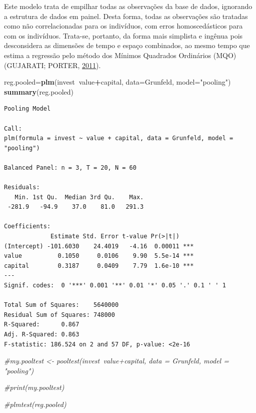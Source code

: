 \documentclass[12pt,brazil,oneside]{book}
\newenvironment{Shaded}{\begin{snugshade}}{\end{snugshade}}
\newcommand{\CommentTok}[1]{\textcolor[rgb]{0.56,0.35,0.01}{\textit{#1}}}
\newcommand{\DataTypeTok}[1]{\textcolor[rgb]{0.13,0.29,0.53}{#1}}
\newcommand{\KeywordTok}[1]{\textcolor[rgb]{0.13,0.29,0.53}{\textbf{#1}}}
\newcommand{\NormalTok}[1]{#1}
\newcommand{\OperatorTok}[1]{\textcolor[rgb]{0.81,0.36,0.00}{\textbf{#1}}}
\newcommand{\StringTok}[1]{\textcolor[rgb]{0.31,0.60,0.02}{#1}}
\begin{document}
Este modelo trata de empilhar todas as observações da base de dados,
ignorando a estrutura de dados em painel. Desta forma, todas as
observações são tratadas como não correlacionadas para os indivíduos,
com erros homoscedásticos para com os indivíduos. Trata-se, portanto, da
forma mais simplista e ingênua pois desconsidera as dimensões de tempo e
espaço combinados, ao mesmo tempo que estima a regressão pelo método dos
Mínimos Quadrados Ordinários (MQO) (GUJARATI; PORTER,
\protect\hyperlink{ref-Gujarati2011}{2011}).

\begin{Shaded}
\begin{Highlighting}[]
\NormalTok{reg.pooled=}\KeywordTok{plm}\NormalTok{(invest}\OperatorTok{~}\NormalTok{value}\OperatorTok{+}\NormalTok{capital, }
               \DataTypeTok{data=}\NormalTok{Grunfeld, }\DataTypeTok{model=}\StringTok{"pooling"}\NormalTok{)}
\KeywordTok{summary}\NormalTok{(reg.pooled)}
\end{Highlighting}
\end{Shaded}

\begin{verbatim}
Pooling Model

Call:
plm(formula = invest ~ value + capital, data = Grunfeld, model = "pooling")

Balanced Panel: n = 3, T = 20, N = 60

Residuals:
   Min. 1st Qu.  Median 3rd Qu.    Max. 
 -281.9   -94.9    37.0    81.0   291.3 

Coefficients:
             Estimate Std. Error t-value Pr(>|t|)    
(Intercept) -101.6030    24.4019   -4.16  0.00011 ***
value          0.1050     0.0106    9.90  5.5e-14 ***
capital        0.3187     0.0409    7.79  1.6e-10 ***
---
Signif. codes:  0 '***' 0.001 '**' 0.01 '*' 0.05 '.' 0.1 ' ' 1

Total Sum of Squares:    5640000
Residual Sum of Squares: 748000
R-Squared:      0.867
Adj. R-Squared: 0.863
F-statistic: 186.524 on 2 and 57 DF, p-value: <2e-16
\end{verbatim}

\begin{Shaded}
\begin{Highlighting}[]
\CommentTok{#my.pooltest <- pooltest(invest~value+capital, data = Grunfeld, model = "pooling")}


\CommentTok{#print(my.pooltest)}

\CommentTok{#plmtest(reg.pooled)}
\end{Highlighting}
\end{Shaded}
\end{document}
